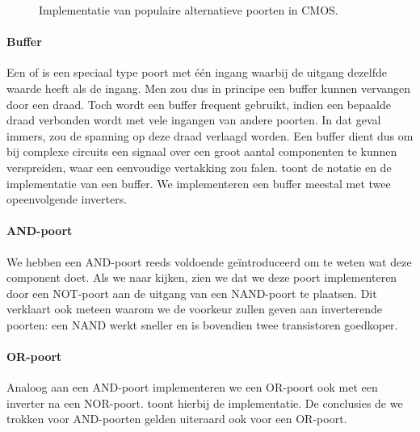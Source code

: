 \begin{figure}[hbt]
{
}
\caption{Implementatie van populaire alternatieve poorten in CMOS.}
\end{figure}
\paragraph{Buffer}
Een  of  is een speciaal type poort met \'e\'en ingang waarbij de uitgang dezelfde waarde heeft als de ingang. Men zou dus in principe een buffer kunnen vervangen door een draad. Toch wordt een buffer frequent gebruikt, indien een bepaalde draad verbonden wordt met vele ingangen van andere poorten. In dat geval immers, zou de spanning op deze draad verlaagd worden. Een buffer dient dus om bij complexe circuits een signaal over een groot aantal componenten te kunnen verspreiden, waar een eenvoudige vertakking zou falen.  toont de notatie en de implementatie van een buffer. We implementeren een buffer meestal met twee opeenvolgende inverters.
\paragraph{AND-poort}
We hebben een AND-poort reeds voldoende ge\"introduceerd om te weten wat deze component doet. Als we naar  kijken, zien we dat we deze poort implementeren door een NOT-poort aan de uitgang van een NAND-poort te plaatsen. Dit verklaart ook meteen waarom we de voorkeur zullen geven aan inverterende poorten: een NAND werkt sneller en is bovendien twee transistoren goedkoper.
\paragraph{OR-poort}
Analoog aan een AND-poort implementeren we een OR-poort ook met een inverter na een NOR-poort.  toont hierbij de implementatie. De conclusies de we trokken voor AND-poorten gelden uiteraard ook voor een OR-poort.
